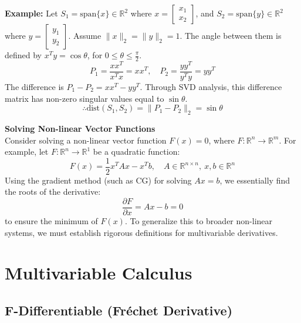 \documentclass[12pt, a4paper]{article}
\theoremstyle{break}
\begin{document}
\textbf{Example:} Let $S_1 = \text{span}\{x\} \in \mathbb{R}^2$ where $x = \begin{bmatrix} x_1 \\ x_2 \end{bmatrix}$, and $S_2 = \text{span}\{y\} \in \mathbb{R}^2$ where $y = \begin{bmatrix} y_1 \\ y_2 \end{bmatrix}$.
Assume $\|x\|_2 = \|y\|_2 = 1$. The angle between them is defined by $x^T y = \cos\theta$, for $0 \le \theta \le \frac{\pi}{2}$.
\begin{equation*}
    P_1 = \frac{x x^T}{x^T x} = x x^T, \quad P_2 = \frac{y y^T}{y^T y} = y y^T
\end{equation*}
The difference is $P_1 - P_2 = x x^T - y y^T$.
Through SVD analysis, this difference matrix has non-zero singular values equal to $\sin\theta$.
\begin{equation*}
    \therefore \text{dist}(S_1, S_2) = \|P_1 - P_2\|_2 = \sin\theta
\end{equation*}

\vspace{0.5cm}
\noindent \textbf{Solving Non-linear Vector Functions} \\
Consider solving a non-linear vector function $F(x) = 0$, where $F: \mathbb{R}^n \to \mathbb{R}^m$.
For example, let $F: \mathbb{R}^n \to \mathbb{R}^1$ be a quadratic function:
\begin{equation*}
    F(x) = \frac{1}{2} x^T A x - x^T b, \quad A \in \mathbb{R}^{n \times n}, \ x, b \in \mathbb{R}^n
\end{equation*}
Using the gradient method (such as CG) for solving $Ax = b$, we essentially find the roots of the derivative:
\begin{equation*}
    \frac{\partial F}{\partial x} = Ax - b = 0
\end{equation*}
to ensure the minimum of $F(x)$.
To generalize this to broader non-linear systems, we must establish rigorous definitions for multivariable derivatives.
\section{Multivariable Calculus}

\subsection{F-Differentiable (Fréchet Derivative)}
\end{document}
